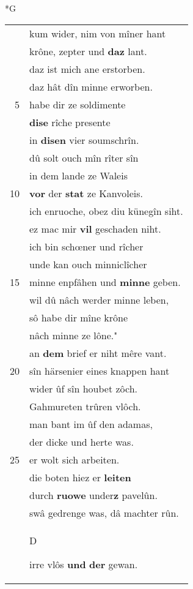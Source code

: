 \documentclass[8pt,a4paper,notitlepage]{article}
\begin{document}
\begin{table}[ht]
\begin{minipage}[t]{0.5\linewidth}
\small
\begin{center}*G
\end{center}
\begin{tabular}{rl}
 & kum wider, nim von mîner hant\\ 
 & krône, zepter und \textbf{daz} lant.\\ 
 & daz ist mich ane erstorben.\\ 
 & daz hât dîn minne erworben.\\ 
5 & habe dir ze soldimente\\ 
 & \textbf{dise} rîche presente\\ 
 & in \textbf{disen} vier soumschrîn.\\ 
 & dû solt ouch mîn rîter sîn\\ 
 & in dem lande ze Waleis\\ 
10 & \textbf{vor} der \textbf{stat} ze Kanvoleis.\\ 
 & ich enruoche, obez diu künegîn siht.\\ 
 & ez mac mir \textbf{vil} geschaden niht.\\ 
 & ich bin schœner und rîcher\\ 
 & unde kan ouch minniclîcher\\ 
15 & minne enpfâhen und \textbf{minne} geben.\\ 
 & wil dû nâch werder minne leben,\\ 
 & sô habe dir mîne krône\\ 
 & nâch minne ze lône."\\ 
 & an \textbf{dem} brief er niht mêre vant.\\ 
20 & sîn härsenier eines knappen hant\\ 
 & wider ûf sîn houbet zôch.\\ 
 & Gahmureten trûren vlôch.\\ 
 & man bant im ûf den adamas,\\ 
 & der dicke und herte was.\\ 
25 & er wolt sich arbeiten.\\ 
 & die boten hiez er \textbf{leiten}\\ 
 & durch \textbf{ruowe} under\textbf{z} pavelûn.\\ 
 & swâ gedrenge was, dâ machter rûn.\\ 
 & \begin{large}D\end{large}irre vlôs \textbf{und} \textbf{der} gewan.\\ 

\end{tabular}
\end{minipage}
\end{table}
\end{document}
